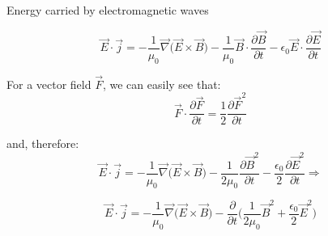 %
%
%
%

\begin{frame}{Energy carried by electromagnetic waves}


\begin{equation*}
 \vec{E} \cdot \vec{j} =
    - \frac{1}{\mu_0} \vec{\nabla} \Big( \vec{E} \times \vec{B} \Big)
    - \frac{1}{\mu_0} \vec{B} \cdot \frac{\partial \vec{B}}{\partial t} - \epsilon_0 \vec{E} \cdot \frac{\partial \vec{E}}{\partial t}
\end{equation*}

For a vector field $\vec{F}$, we can easily see that:
\begin{equation*}
  \vec{F} \cdot \frac{\partial \vec{F}}{\partial t} = \frac{1}{2} \frac{\partial \vec{F}^2}{\partial t}
\end{equation*}

and, therefore:
\begin{equation*}
 \vec{E} \cdot \vec{j} =
    - \frac{1}{\mu_0} \vec{\nabla} \Big( \vec{E} \times \vec{B} \Big)
    - \frac{1}{2\mu_0} \frac{\partial \vec{B}^2}{\partial t} - \frac{\epsilon_0}{2} \frac{\partial \vec{E}^2}{\partial t} \Rightarrow
\end{equation*}

\begin{equation*}
 \vec{E} \cdot \vec{j} =
    - \frac{1}{\mu_0} \vec{\nabla} \Big( \vec{E} \times \vec{B} \Big)
    - \frac{\partial}{\partial t} \Big( \frac{1}{2\mu_0} \vec{B}^2 + \frac{\epsilon_0}{2} \vec{E}^2 \Big)
\end{equation*}

\end{frame}


%
%
%
%


